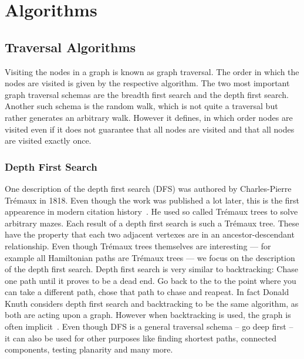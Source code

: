     \newpage
    \section{Algorithms}\label{queries}
        \subsection{Traversal Algorithms}
            Visiting the nodes in a graph is known as graph traversal. 
            The order in which the nodes are visited is given by the respective algorithm. 
            The two most important graph traversal schemas are the breadth first search and the depth first search. 
            Another such schema is the random walk, which is not quite a traversal but rather generates an arbitrary walk. 
            However it defines, in which order nodes are visited even if it does not guarantee that all nodes are visited and that all nodes are visited exactly once.
            \subsubsection*{Depth First Search}
                One description of the depth first search (DFS) was authored by Charles-Pierre Trémaux in 1818.
                Even though the work was published a lot later, this is the first appearence in modern citation history~\autocite{lucas1891recreations}. 
                He used so called Trémaux trees to solve arbitrary mazes. 
                Each result of a depth first search is such a Trémaux tree.
                These have the property that each two adjacent vertexes are in an ancestor-descendant relationship.
                Even though Trémaux trees themselves are interesting --- for example all Hamiltonian paths are Trémaux trees --- we focus on the description of the depth first search.        
                Depth first search is very similar to backtracking: Chase one path until it proves to be a dead end. 
                Go back to the to the point where you can take a different path, chose that path to chase and reapeat. 
                In fact Donald Knuth considers depth first search and backtracking to be the same algorithm, as both are acting upon a graph. 
                However when backtracking is used, the graph is often implicit~\autocite{Knuth2000DancingL}.        
                Even though DFS is a general traversal schema -- go deep first -- it can also be used for other purposes like finding shortest paths, connected components, testing planarity and many more. 
                        
